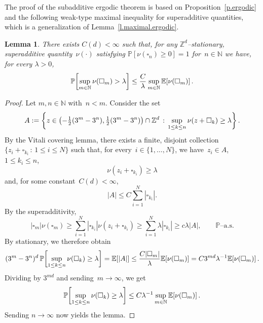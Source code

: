 \documentclass[11pt]{article} %
\let\oldsquare\square %
\renewcommand{\square}{\oldsquare}
\numberwithin{equation}{section}
\newtheorem{lemma}[theorem]{Lemma}
\theoremstyle{definition}
\let\originalleft\left
\let\originalright\right
\renewcommand{\left}{\mathopen{}\mathclose\bgroup\originalleft}
\renewcommand{\right}{\aftergroup\egroup\originalright}
\newcommand*{\N}{\ensuremath{\mathbb{N}}}
\newcommand*{\Zd}{\ensuremath{\mathbb{Z}^d}}
\newcommand{\cu}{\square}
\renewcommand{\P}{\mathbb{P}}
\newcommand{\E}{\mathbb{E}}
\begin{document}
The proof of the subadditive ergodic theorem is based on Proposition~\ref{p.ergodic} and the following weak-type maximal inequality for superadditive quantities, which is a generalization of Lemma~\ref{l.maximal.ergodic}.

\begin{lemma}
\label{l.maximal.superadditive}
There exists $C(d)<\infty$ such that, for any $\Zd$--stationary, superadditive quantity~$\nu(\cdot)$ satisfying $\P [ \nu(\cu_n)\geq 0] = 1$ for~$n\in\N$ we have, for every $\lambda>0$, 
\begin{align}
\label{e.maximal.superadditive}
\P \left[ \sup_{m\in\N} \nu(\cu_m) > \lambda \right] 
\leq 
\frac{C}{\lambda} 
\sup_{m\in\N} \E \left[ \nu(\cu_m) \right]
\,.
\end{align}
\end{lemma}
\begin{proof}

Let $m,n \in\N$ with~$n<m$. Consider the set 
\begin{equation*}
A:=
\biggl\{
z \in \left( -\tfrac12 (3^m-3^n) , \tfrac12 (3^m-3^n) \right) \cap \Zd \,:\, \sup_{1\leq k \leq n} \nu (z+\cu_k) \geq \lambda
\biggr\}
\,.
\end{equation*}
By the Vitali covering lemma, there exists a finite, disjoint collection~$\{ z_i + \cu_{k_i} \,:\, 1\leq i \leq N\}$ such that, for every~$i\in \{1,\ldots,N\}$, we have~$z_i \in A$,~$1\leq k_i \leq n$, 
\begin{equation*}
\nu (z_i+\cu_{k_i}) \geq \lambda
\end{equation*}
and, for some constant~$C(d)<\infty$, 
\begin{equation*}
|A|
\leq C
\sum_{i=1}^N 
|\cu_{k_i}|  
. 
\end{equation*}
By the superadditivity, 
\begin{equation*}
|\cu_m| \nu(\cu_m) 
\geq 
\sum_{i=1}^N 
|\cu_{k_i}| \nu(z_i + \cu_{k_i}) 
\geq 
\sum_{i=1}^N \lambda |\cu_{k_i}|  
\geq 
c \lambda |A|,\qquad \P\text{--a.s.}
\end{equation*}
By stationary, we therefore obtain
\begin{equation*}
(3^m-3^n)^{d} \,
\P \left[ \sup_{1\leq k \leq n} \nu(\cu_k) \geq \lambda \right]
=
\E\left[ |A| \right] 
\leq 
\frac{C|\cu_m| }{\lambda} \E \left[ \nu(\cu_m) \right]
= 
C 3^{md} \lambda^{-1} \E \left[ \nu(\cu_m) \right]
\,.
\end{equation*}
Dividing by $3^{md}$ and sending~$m\to \infty$, we get 
\begin{equation*}
\P \left[ \sup_{1\leq k \leq n} \nu(\cu_k) \geq \lambda \right]
\leq
C \lambda^{-1}  \sup_{m\in\N} \E \left[ \nu(\cu_m) \right]
\,.
\end{equation*}
Sending $n\to \infty$ now yields the lemma. 
\end{proof}
\end{document}
